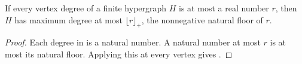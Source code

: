 \begin{lemma}
If every vertex degree of a finite hypergraph $H$ is at most a real number
$r$, then $H$ has maximum degree at most $\lfloor r\rfloor_+$, the
nonnegative natural floor of $r$.
\end{lemma}
\begin{proof}
Each degree in  is a natural number. A natural
number at most $r$ is at most its natural floor. Applying this at every
vertex gives .
\end{proof}
